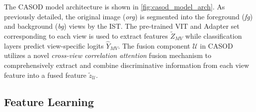 The CASOD model architecture is shown in \ref{fig:casod_model_arch}. As previously detailed, the original image (\textit{org}) is segmented into the foreground (\textit{fg}) and background (\textit{bg}) views by the IST. The pre-trained VIT and Adapter set corresponding to each view is used to extract features $\tilde{Z}_{MV}$ while classification layers predict view-specific logits $\hat{Y}_{MV}$. The fusion component $\mathcal{U}$ in CASOD utilizes a novel \textit{cross-view correlation attention} fusion mechanism to comprehensively extract and combine discriminative information from each view feature into a fused feature $\tilde{z}_{\mathcal{U}}$.

\subsection{Feature Learning}
\label{sec:casod_method-rep}

